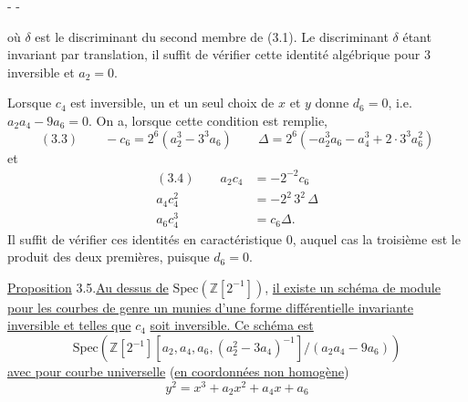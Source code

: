 -  -

où $\delta$ est le discriminant du second membre de (3.1). Le discriminant $\delta$ étant invariant par translation, il suffit de vérifier cette identité algébrique pour 3 inversible et $a_2=0$.

Lorsque $c_4$ est inversible, un et un seul choix de $x$ et $y$ donne $d_6=0$, i.e. $a_2a_4-9a_6=0$. On a, lorsque cette condition est remplie,
\[
(3.3)\qquad -c_6=2^6(a_2^3-3^3a_6)\qquad\Delta=2^6(-a_2^3a_6-a_4^3+2\cdot3^3a_6^2)
\]
et
\[
\begin{aligned}
(3.4)\qquad a_2c_4&=-2^{-2}c_6\\
a_4c_4^2&=-2^2\,3^2\,\Delta\\
a_6c_4^3&=c_6\Delta.
\end{aligned}
\]
Il suffit de vérifier ces identités en caractéristique 0, auquel cas la troisième est le produit des deux premières, puisque $d_6=0$.

\uline{Proposition} 3.5.\quad \uline{Au dessus de} $\mathrm{Spec}(\mathbb Z[2^{-1}])$, \uline{il existe un schéma de module pour les courbes de genre un munies d'une forme différentielle invariante inversible et telles que} $c_4$ \uline{soit inversible. Ce schéma est}
\[
\mathrm{Spec}(\mathbb Z[2^{-1}][a_2,a_4,a_6,(a_2^2-3a_4)^{-1}]/(a_2a_4-9a_6))
\]
\uline{avec pour courbe universelle} (\uline{en coordonnées non homogène}) \inserted{\unsure{$\rho$}}
\[
y^2=x^3+a_2x^2+a_4x+a_6
\]
